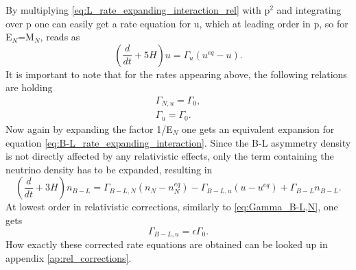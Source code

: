 By multiplying \eqref{eq:L_rate_expanding_interaction_rel} with p$^2$ and integrating over p one can easily get a rate equation for u, which at leading order in p, so for E$_N$=M$_N$, reads as
\begin{equation}
	\left(\frac{d}{dt}+5H\right)u=\Gamma_u\left(u^{eq}-u\right).
	\label{eq:rate_u}
\end{equation}
It is important to note that for the rates appearing above, the following relations are holding
\begin{align}
	\Gamma_{N,u}=\Gamma_{0},
	\label{eq:Gamma_N,u}
	\\
	\Gamma_{u}=\Gamma_{0}.
	\label{eq:Gamma_u}
\end{align}
Now again by expanding the factor 1/E$_N$ one gets an equivalent expansion for equation \eqref{eq:B-L_rate_expanding_interaction}. Since the B-L asymmetry density is not directly affected by any relativistic effects, only the term containing the neutrino density has to be expanded, resulting in
\begin{equation}
	\left(\frac{d}{dt}+3H\right)n_{B-L}=\Gamma_{B-L,N}\left(n_N-n_N^{eq}\right)-\Gamma_{B-L,u}\left(u-u^{eq}\right)+\Gamma_{B-L}n_{B-L}.
	\label{eq:B-L_rate_expanding_interaction_rel}
\end{equation}
At lowest order in relativistic corrections, similarly to \eqref{eq:Gamma_B-L,N}, one gets
\begin{equation}
	\Gamma_{B-L,u}=\epsilon\Gamma_0.
	\label{eq:Gamma_B-L,u}
\end{equation}
How exactly these corrected rate equations are obtained can be looked up in appendix \ref{ap:rel_corrections}.

